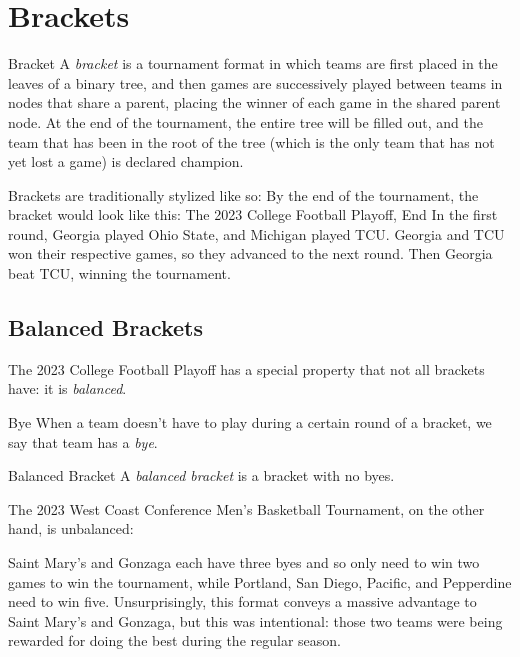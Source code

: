 \documentclass[../main.tex]{subfiles}
\begin{document}
\section {Brackets} 

\begin{definition}{Bracket}{}
A \textit{bracket} is a tournament format in which teams are first placed in the leaves of a binary tree, and then games are successively played between teams in nodes that share a parent, placing the winner of each game in the shared parent node. At the end of the tournament, the entire tree will be filled out, and the team that has been in the root of the tree (which is the only team that has not yet lost a game) is declared champion.
\end{definition}

Brackets are traditionally stylized like so:
By the end of the tournament, the bracket would look like this:
 {The 2023 College Football Playoff, End}{}
In the first round, Georgia played Ohio State, and Michigan played TCU. Georgia and TCU won their respective games, so they advanced to the next round. Then Georgia beat TCU, winning the tournament.

\subsection{Balanced Brackets}

The 2023 College Football Playoff has a special property that not all brackets have: it is \textit{balanced}. 
\begin{definition}{Bye}{}
    When a team doesn't have to play during a certain round of a bracket, we say that team has a \textit{bye}.
\end{definition}
\begin{definition}{Balanced Bracket}{}
    A \textit{balanced bracket} is a bracket with no byes.
\end{definition} 

The 2023 West Coast Conference Men's Basketball Tournament, on the other hand, is unbalanced:



Saint Mary's and Gonzaga each have three byes and so only need to win two games to win the tournament, while Portland, San Diego, Pacific, and Pepperdine need to win five. Unsurprisingly, this format conveys a massive advantage to Saint Mary's and Gonzaga, but this was intentional: those two teams were being rewarded for doing the best during the regular season.
\end{document}
